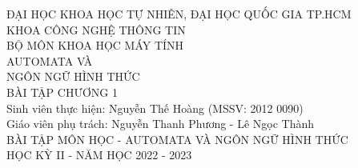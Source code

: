 \documentclass[12pt, a4paper]{article}
\begin{document}
	

	\begin{titlepage}
		\centering
		\large
		ĐẠI HỌC KHOA HỌC TỰ NHIÊN, ĐẠI HỌC QUỐC GIA TP.HCM\\[.1in]
		KHOA CÔNG NGHỆ THÔNG TIN\\BỘ MÔN KHOA HỌC MÁY TÍNH\\
		\vfill
		\huge AUTOMATA VÀ\\NGÔN NGỮ HÌNH THỨC\\[.1in]
		\LARGE BÀI TẬP CHƯƠNG 1\\
		\vfill
		\RaggedRight
		\large
		Sinh viên thực hiện: Nguyễn Thế Hoàng (MSSV: 2012 0090)\\[.1in]
		Giáo viên phụ trách: Nguyễn Thanh Phương - Lê Ngọc Thành\\[.2in]
		\Centering
		BÀI TẬP MÔN HỌC - AUTOMATA VÀ NGÔN NGỮ HÌNH THỨC\\[.1in]
		HỌC KỲ II - NĂM HỌC 2022 - 2023
	\end{titlepage}
	
	\newpage	
	
	
\end{document}
